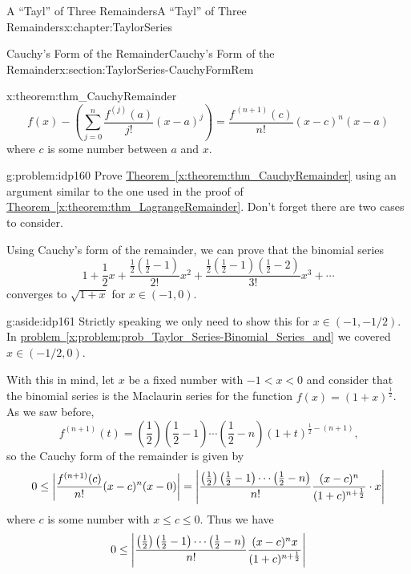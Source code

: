 \begin{chapterptx}{A ``Tayl'' of Three Remainders}{}{A ``Tayl'' of Three Remainders}{}{}{x:chapter:TaylorSeries}
\begin{sectionptx}{Cauchy's Form of the Remainder}{}{Cauchy's Form of the Remainder}{}{}{x:section:TaylorSeries-CauchyFormRem}
\begin{theorem}{}{}{x:theorem:thm_CauchyRemainder}
\begin{equation*}
				f(x)-\left(\sum_{j=0}^n\frac{f^{(j)}(a)}{j!}(x-a)^j\right)=\frac{f^{\, (n+1)}(c)}{n!}(x-c)^n(x-a)
			\end{equation*}
			where \(c\) is some number between \(a\) and \(x\).%
		\end{theorem}
		\begin{problem}{}{g:problem:idp160}%
			 Prove \hyperref[x:theorem:thm_CauchyRemainder]{Theorem~{\xreffont\ref{x:theorem:thm_CauchyRemainder}}} using an argument similar to the one used in the proof of \hyperref[x:theorem:thm_LagrangeRemainder]{Theorem~{\xreffont\ref{x:theorem:thm_LagrangeRemainder}}}. Don't forget there are two cases to consider.%
		\end{problem}
		Using Cauchy's form of the remainder, we can prove that the binomial series%
		\begin{equation*}
			1+\frac{1}{2}x+\frac{\frac{1}{2}\left(\frac{1}{2}-1\right)}{2!}x^2+\frac{\frac{1}{2}\left(\frac{1}{2}-1\right)\left(\frac{1}{2}-2\right)}{3!}x^3+\cdots
		\end{equation*}
		converges to \(\sqrt{1+x}\) for \(x\in(-1,0).\)%
		\begin{aside}{}{g:aside:idp161}%
			Strictly speaking we only need to show this for \(x\in(-1,-1/2).\)In \hyperref[x:problem:prob_Taylor_Series-Binomial_Series_and]{problem~{\xreffont\ref{x:problem:prob_Taylor_Series-Binomial_Series_and}}} we covered\(x\in (-1/2,0)\).%
		\end{aside}
		With this in mind, let \(x\) be a fixed number with \(-1\lt x\lt 0\) and consider that the binomial series is the Maclaurin series for the function \(f(x)=(1+x)^{\frac{1}{2}}\). As we saw before,%
		\begin{equation*}
			f^{(n+1)}(t)=\left(\frac{1}{2}\right)\left(\frac{1}{2}-1\right)\cdots\left(\frac{1}{2}-n\right)\left(1+t\right)^{\frac{1}{2}-(n+1)}\text{,}
		\end{equation*}
		so the Cauchy form of the remainder is given by%
		\begin{equation*}
			0\le\left|\frac{f^{(n+1)}(c)}{n!}(x-c)^n(x-0)\right|= \left|\frac{\left(\frac{1}{2}\right)\left(\frac{1}{2}-1\right)\cdots\left(\frac{1}{2}-n\right)}{n!}\frac{(x-c)^n}{(1+c)^{n+\frac{1}{2}}}\cdot x\right|
		\end{equation*}
		where \(c\) is some number with \(x\leq c\leq 0\). Thus we have%
		\begin{align*}
			0\amp \leq\left|\frac{\left(\frac{1}{2}\right)\left(\frac{1}{2}-1\right)\cdots\left(\frac{1}{2}-n\right)}{n!}\frac{(x-c)^nx}{(1+c)^{n+\frac{1}{2}}}\right|\\

\end{align*}
\end{sectionptx}
\end{chapterptx}
